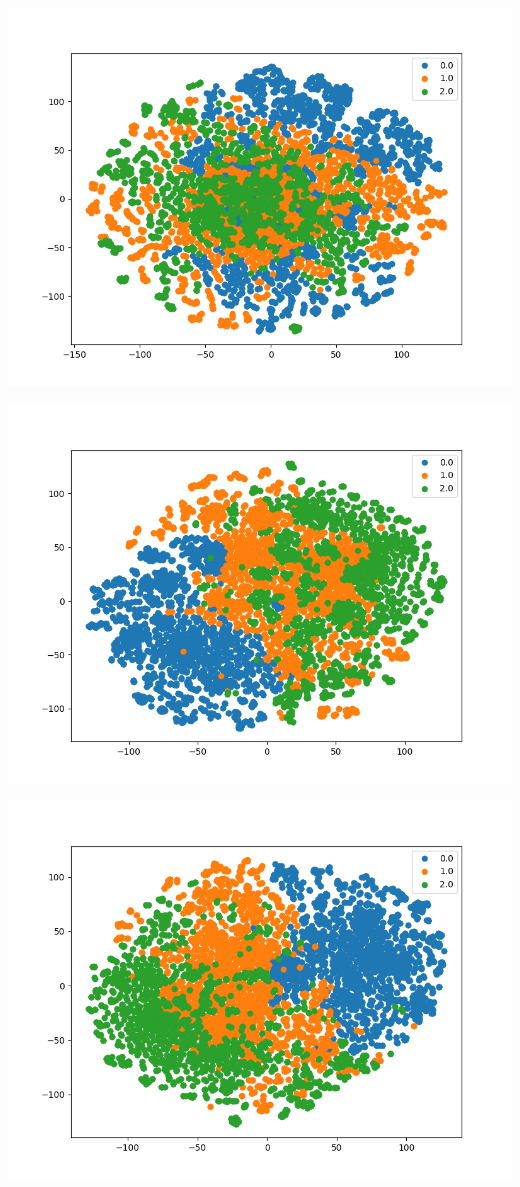 \documentclass[11pt]{article}
\begin{document}
\begin{center}
    \begin{minipage}{0.3\linewidth}
    \includegraphics[width=\linewidth]{TML-TSNE-0.png}
    \end{minipage}
    \begin{minipage}{0.3\linewidth}
    \includegraphics[width=\linewidth]{TML-TSNE-15.png}
    \end{minipage}
    \begin{minipage}{0.3\linewidth}
    \includegraphics[width=\linewidth]{TML-TSNE-30.png}

\end{minipage}
\end{center}
\end{document}
